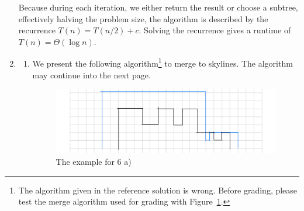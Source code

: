 \documentclass{article}
\begin{document}
\begin{enumerate}
    Because during each iteration, we either return the result or choose a subtree, effectively halving the problem size, the algorithm is described by the recurrence $T(n) = T(n/2) + c$. Solving the recurrence gives a runtime of $T(n) = \Theta(\log n)$.

    \item
    \begin{enumerate}
        \item We present the following algorithm\footnote{The algorithm given in the reference solution is wrong. Before grading, please test the merge algorithm used for grading with Figure~\ref{fig:6a}.} to merge to skylines. The algorithm may continue into the next page.

        \begin{figure}[bt]
            \includegraphics[width=\linewidth]{img/5-6a-example.jpeg}
            \caption{The example for 6 a)}
            \label{fig:6a}
        \end{figure}
        

\end{enumerate}
\end{enumerate}
\end{document}
